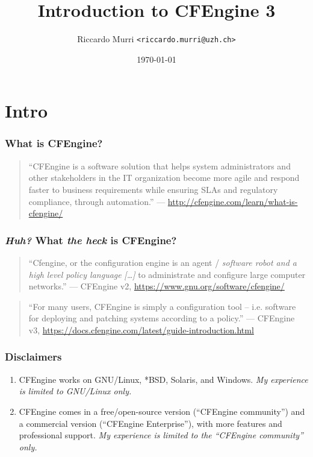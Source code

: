 \documentclass[english,serif,mathserif,usenames,dvipsnames]{beamer}
\begin{document}
\title[CFEngine 3]{Introduction to CFEngine 3}
\author{Riccardo Murri \texttt{<riccardo.murri@uzh.ch>}}
\date{\today}

\maketitle

\section{Intro}
\begin{frame}
  \frametitle{What is CFEngine?}
  \begin{quote}
    ``CFEngine is a software solution that helps system administrators
    and other stakeholders in the IT organization become more agile
    and respond faster to business requirements while ensuring SLAs
    and regulatory compliance, through automation.''
    --- \url{http://cfengine.com/learn/what-is-cfengine/}
  \end{quote}
\end{frame}


\begin{frame}
  \frametitle{\emph{Huh?} What \emph{the heck} is CFEngine?}
  \begin{quote}
    ``Cfengine, or the configuration engine is an agent /
    \emph{software robot and a high level policy language}
    \emph{[\ldots]} to administrate and configure large computer
    networks.''  --- CFEngine v2,
    \url{https://www.gnu.org/software/cfengine/}
  \end{quote}

  \begin{quote}
    ``For many users, CFEngine is simply a configuration tool –
    i.e. software for deploying and patching systems according to a
    policy.''
    --- CFEngine v3, \url{https://docs.cfengine.com/latest/guide-introduction.html}
  \end{quote}
\end{frame}


\begin{frame}
  \frametitle{Disclaimers}
  \begin{enumerate}
  \item CFEngine works on GNU/Linux, *BSD, Solaris, and Windows.
    \emph{My experience is limited to GNU/Linux only.}
  \item CFEngine comes in a free/open-source version (``CFEngine
    community'') and a commercial version (``CFEngine Enterprise''),
    with more features and professional support.  \emph{My experience
      is limited to the ``CFEngine community'' only.}
  \end{enumerate}
\end{frame}
\end{document}
